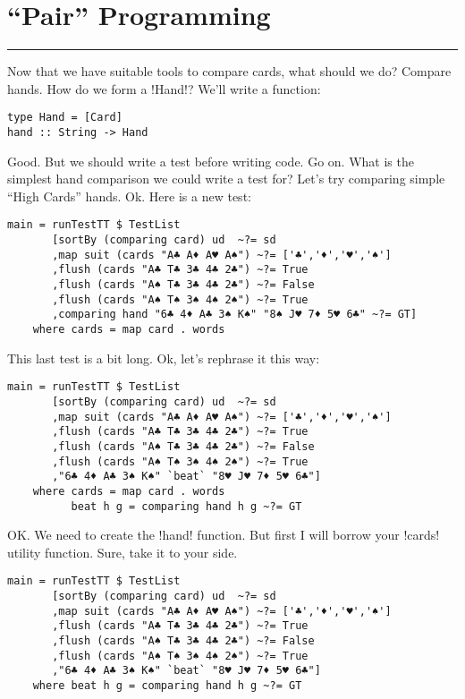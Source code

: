 \newpage
\section{``Pair'' Programming} 
\vspace{10cm}
\hrule

\lhQ Now that we have suitable tools to compare cards, what should we do?
\lhA Compare hands.
\lhN How do we form a \il!Hand!?
\lhA We'll write a function:
\begin{lstlisting}[frame=single]
type Hand = [Card]
hand :: String -> Hand
\end{lstlisting}
\lhN Good. But we should write a test before writing code.
\lhA Go on.
\lhN What is the simplest hand comparison we could write a test for?
\lhA Let's try comparing simple ``High Cards'' hands.
\lhN Ok. Here is a new test:
\begin{lstlisting}[frame=single,escapechar=!]
main = runTestTT $ TestList 
       [sortBy (comparing card) ud  ~?= sd
       ,map suit (cards "A♣ A♦ A♥ A♠") ~?= ['♣','♦','♥','♠']
       ,flush (cards "A♣ T♣ 3♣ 4♣ 2♣") ~?= True
       ,flush (cards "A♠ T♣ 3♣ 4♣ 2♣") ~?= False
       ,flush (cards "A♠ T♠ 3♠ 4♠ 2♠") ~?= True
       ,comparing hand "6♣ 4♦ A♣ 3♠ K♠" "8♠ J♥ 7♦ 5♥ 6♣" ~?= GT]
    where cards = map card . words 
\end{lstlisting} %
\lhA This last test is a bit long.
\lhN Ok, let's rephrase it this way:
\begin{lstlisting}[frame=single]
main = runTestTT $ TestList 
       [sortBy (comparing card) ud  ~?= sd
       ,map suit (cards "A♣ A♦ A♥ A♠") ~?= ['♣','♦','♥','♠']
       ,flush (cards "A♣ T♣ 3♣ 4♣ 2♣") ~?= True
       ,flush (cards "A♠ T♣ 3♣ 4♣ 2♣") ~?= False
       ,flush (cards "A♠ T♠ 3♠ 4♠ 2♠") ~?= True
       ,"6♣ 4♦ A♣ 3♠ K♠" `beat` "8♥ J♥ 7♦ 5♥ 6♣"]
    where cards = map card . words 
          beat h g = comparing hand h g ~?= GT
\end{lstlisting} %
\lhA \error OK. We need to create the \il!hand! function. But first I will borrow your \il!cards! utility function.
\lhN Sure, take it to your side.
\begin{lstlisting}[frame=single]
main = runTestTT $ TestList 
       [sortBy (comparing card) ud  ~?= sd
       ,map suit (cards "A♣ A♦ A♥ A♠") ~?= ['♣','♦','♥','♠']
       ,flush (cards "A♣ T♣ 3♣ 4♣ 2♣") ~?= True
       ,flush (cards "A♠ T♣ 3♣ 4♣ 2♣") ~?= False
       ,flush (cards "A♠ T♠ 3♠ 4♠ 2♠") ~?= True
       ,"6♣ 4♦ A♣ 3♠ K♠" `beat` "8♥ J♥ 7♦ 5♥ 6♣"]
    where beat h g = comparing hand h g ~?= GT
\end{lstlisting} %
